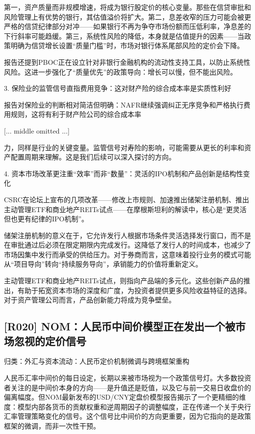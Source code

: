 \documentclass[11pt]{ctexart}
\begin{document}
第一，资产质量而非规模增速，将成为银行股定价的核心变量。那些在信贷审批和风险管理上有优势的银行，其估值溢价将扩大。第二，息差收窄的压力可能会被更严格的信贷纪律部分对冲——如果银行不再为争夺市场份额而压低利率，净息差的下行斜率可能趋缓。第三，系统性风险的降低，本身就是估值提升的因素——当政策明确为信贷增长设置“质量门槛”时，市场对银行体系尾部风险的定价会下降。

报告还提到PBOC正在设立针对非银行金融机构的流动性支持工具，以防止系统性风险。这进一步强化了“质量优先”的政策导向：增长可以慢，但不能出风险。

3. 保险业的监管信号直指费用竞争：这对财产险的综合成本率是实质性利好

报告对保险业的判断相对简洁但明确：NAFR继续强调纠正无序竞争和严格执行费用规则，这将有利于财产险公司的综合成本率

[... middle omitted ...]

力，同样是行业的关键变量。监管信号对寿险的影响，可能需要从更长的利率和资产配置周期来理解。这是我们后续可以深入探讨的方向。

4. 资本市场改革更注重“效率”而非“数量”：灵活的IPO机制和产品创新是结构性变化

CSRC在论坛上宣布的几项改革——修改上市规则、加速推出储架注册机制、推出主动管理ETF和商业地产REITs试点——在摩根斯坦利的解读中，核心是“更灵活但也更有纪律的IPO机制”。

储架注册机制的意义在于，它允许发行人根据市场条件灵活选择发行窗口，而不是在审批通过后必须在限定期限内完成发行。这降低了发行人的时间成本，也减少了市场因集中发行而承受的供给压力。对于券商而言，这意味着投行业务的模式可能从“项目导向”转向“持续服务导向”，承销能力的价值将重新定义。

主动管理ETF和商业地产REITs试点，则指向产品端的多元化。这些创新产品的推出，有助于拓宽资本市场的深度和广度，为投资者提供更多风险收益特征的选择。对于资产管理公司而言，产品创新能力将成为竞争壁垒。

\subsection{[R020] NOM：人民币中间价模型正在发出一个被市场忽视的定价信号}
{\small\color{refgray}归类：外汇与资本流动：人民币定价机制微调与跨境框架重构}

人民币汇率中间价的每日设定，长期以来被市场视为一个政策信号灯。大多数投资者关注的是中间价本身的方向——是升值还是贬值，以及它与前一交易日收盘价的偏离幅度。但NOM最新发布的USD/CNY定盘价模型报告揭示了一个更精细的维度：模型内部各货币的贡献权重和逆周期因子的调整幅度，正在传递一个关于央行汇率管理策略变化的信号。这个信号比中间价的方向更重要，因为它指向的是政策框架的微调，而非一次性干预。
\end{document}
